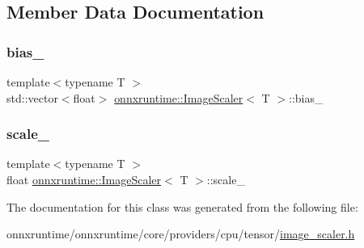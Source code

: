 \subsection{Member Data Documentation}
\mbox{\label{classonnxruntime_1_1ImageScaler_aefdecedc355195cb19ccdb2db452fe33}} 
\subsubsection{\texorpdfstring{bias\+\_\+}{bias\_}}
{\footnotesize\ttfamily template$<$typename T $>$ \\
std\+::vector$<$float$>$ \mbox{\hyperlink{classonnxruntime_1_1ImageScaler}{onnxruntime\+::\+Image\+Scaler}}$<$ T $>$\+::bias\+\_\+\hspace{0.3cm}{\ttfamily [protected]}}

\mbox{\label{classonnxruntime_1_1ImageScaler_a43010f6839787f7fd46ae8ece2d363aa}} 
\subsubsection{\texorpdfstring{scale\+\_\+}{scale\_}}
{\footnotesize\ttfamily template$<$typename T $>$ \\
float \mbox{\hyperlink{classonnxruntime_1_1ImageScaler}{onnxruntime\+::\+Image\+Scaler}}$<$ T $>$\+::scale\+\_\+\hspace{0.3cm}{\ttfamily [protected]}}



The documentation for this class was generated from the following file\+:\begin{DoxyCompactItemize}
\item 
onnxruntime/onnxruntime/core/providers/cpu/tensor/\mbox{\hyperlink{cpu_2tensor_2image__scaler_8h}{image\+\_\+scaler.\+h}}\end{DoxyCompactItemize}
